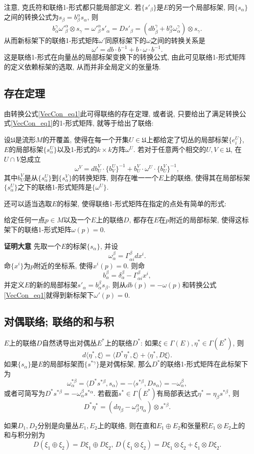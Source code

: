注意, 克氏符和联络1-形式都只能局部定义. 若$\{s'_\beta\}$是$E$的另一个局部标架, 同$\{s_\alpha\}$之间的转换公式为$s_\beta=b_\beta^\alpha s_\alpha$, 则
$$
b_\alpha^\gamma{\omega'}_{\beta}^{\alpha}\otimes s_\gamma={\omega'}_{\beta}^{\alpha}s'_\alpha=Ds'_\beta=(db_\beta^\gamma+b_\beta^\alpha\omega_\alpha^\gamma)\otimes s_\gamma.
$$
从而新标架下的联络1-形式矩阵$\omega'$同原标架下的$\omega$之间的转换关系是
\begin{equation}\label{VecCon_eq1}
\omega'=db\cdot b^{-1}+b\cdot\omega\cdot b^{-1}.
\end{equation}
这是联络1-形式在向量丛的局部标架变换下的转换公式, 由此可见联络1-形式矩阵的定义依赖标架的选取, 从而并非全局定义的张量场.

\subsection{存在定理}
由转换公式\autoref{VecCon_eq1}此可得联络的存在定理, 或者说, 只要给出了满足转换公式\autoref{VecCon_eq1}的1-形式矩阵, 就等于给出了联络:
\begin{theorem}{}
设$\mathfrak{U}$是流形$M$的开覆盖, 使得在每一个开集$U\in\mathfrak{U}$上都给定了切丛的局部标架$\{e^U_i\}$, $E$的局部标架$\{s^U_\alpha\}$以及1-形式的$k\times k$方阵$\omega^U$. 若对于任意两个相交的$U,V\in\mathfrak{U}$, 在$U\cap V$总成立
$$
\omega^V=db^V_U\cdot \{b_V^U\}^{-1}+b^V_U\cdot\omega^U\cdot \{b^V_U\}^{-1},
$$
其中$b^V_U$是从$\{s^U_\alpha\}$到$\{s^V_\alpha\}$的转换矩阵, 则存在唯一一个$E$上的联络, 使得其在局部标架$\{s^U_\alpha\}$之下的联络1-形式矩阵是$\{\omega^U\}$.
\end{theorem}

还可以适当选取$E$的标架, 使得联络1-形式矩阵在指定的点处有简单的形式:
\begin{theorem}{}
给定任何一点$p\in M$以及一个$E$上的联络$D$, 都存在$E$在$p$附近的局部标架, 使得这标架下的联络1-形式矩阵$\omega(p)=0$.
\end{theorem}
\textbf{证明大意} 先取一个$E$的标架$\{s_\alpha\}$, 并设
$$
\omega^\beta_\alpha=\Gamma_{\alpha i}^\beta dx^i.
$$
命$\{x^i\}$为$p$附近的坐标系, 使得$x^i(p)=0$. 则命
$$
b_\alpha^\beta=\delta_\alpha^\beta-\Gamma_{\alpha i}^\beta x^i,
$$
并定义$E$的新的局部标架$s'_\alpha=b_\alpha^\beta s_\beta$. 则从$db(p)=-\omega(p)$和转换公式\autoref{VecCon_eq1}就得到新标架下$\omega'(p)=0$.

\subsection{对偶联络; 联络的和与积}
$E$上的联络$D$自然诱导出对偶丛$E^*$上的联络$D^*$: 如果$\xi\in\Gamma(E),\eta^*\in\Gamma(E^*)$, 则
$$
d\langle \eta^*,\xi\rangle=\langle D^*\eta^*,\xi\rangle+\langle \eta^*,D\xi\rangle.
$$
如果$\{s_\alpha\}$是$E$的局部标架而$\{s^{*\gamma}\}$是对偶标架, 那么$D^*$的联络1-形式矩阵在此标架下为
$$
\omega^{*\beta}_\alpha
=\langle D^*s^{*\beta},s_\alpha\rangle
=-\langle s^{*\beta},Ds_\alpha\rangle
=-\omega^\beta_\alpha,
$$
或者可简写为$D^*s^{*\beta}=-\omega^\beta_\alpha s^{*\alpha}$. 若截面$s^*\in\Gamma(E^*)$有局部表达式$\eta^*=\eta_\beta s^{*\beta}$, 则
$$
D^*\eta^*=(d\eta_\beta-\omega_\beta^\alpha\eta_\alpha)\otimes s^{*\beta}.
$$

如果$D_1,D_2$分别是向量丛$E_1,E_2$上的联络, 则在直和$E_1\oplus E_2$和张量积$E_1\otimes E_2$上的和与积分别为
$$
D(\xi_1\oplus \xi_2)=D\xi_1\oplus D\xi_2,
\,
D(\xi_1\otimes \xi_2)=D\xi_1\otimes \xi_2+\xi_1\otimes D\xi_2.
$$